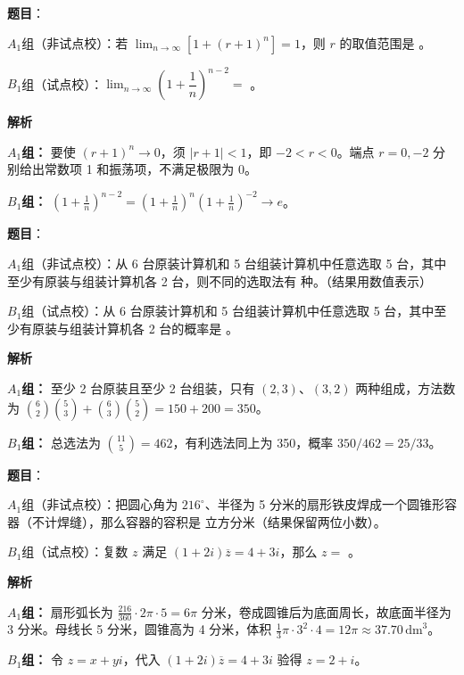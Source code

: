 \begin{answer}

\textbf{题目}：

$A_1$组（非试点校）：若 $\lim_{n\to\infty}[1+(r+1)^n]=1$，则 $r$ 的取值范围是 \gkblank{}。

$B_1$组（试点校）：$\lim_{n\to\infty}\left(1+\dfrac1n\right)^{n-2}=$ \gkblank{}。

\textbf{解析}

\textbf{$A_1$组：} 要使 $(r+1)^n\to0$，须 $|r+1|<1$，即 $-2<r<0$。端点 $r=0,-2$ 分别给出常数项 1 和振荡项，不满足极限为 0。

\textbf{$B_1$组：} $\left(1+\frac1n\right)^{n-2}=\left(1+\frac1n\right)^n\left(1+\frac1n\right)^{-2}\to e$。


\end{answer}
\begin{answer}

\textbf{题目}：

$A_1$组（非试点校）：从 6 台原装计算机和 5 台组装计算机中任意选取 5 台，其中至少有原装与组装计算机各 2 台，则不同的选取法有 \gkblank{} 种。（结果用数值表示）

$B_1$组（试点校）：从 6 台原装计算机和 5 台组装计算机中任意选取 5 台，其中至少有原装与组装计算机各 2 台的概率是 \gkblank{}。

\textbf{解析}

\textbf{$A_1$组：} 至少 2 台原装且至少 2 台组装，只有 $(2,3)$、$(3,2)$ 两种组成，方法数为 $\binom62\binom53+\binom63\binom52=150+200=350$。

\textbf{$B_1$组：} 总选法为 $\binom{11}{5}=462$，有利选法同上为 350，概率 $350/462=25/33$。


\end{answer}
\begin{answer}

\textbf{题目}：

$A_1$组（非试点校）：把圆心角为 $216^\circ$、半径为 5 分米的扇形铁皮焊成一个圆锥形容器（不计焊缝），那么容器的容积是 \gkblank{} 立方分米（结果保留两位小数）。

$B_1$组（试点校）：复数 $z$ 满足 $(1+2i)\overline z=4+3i$，那么 $z=$ \gkblank{}。

\textbf{解析}

\textbf{$A_1$组：} 扇形弧长为 $\frac{216}{360}\cdot2\pi\cdot5=6\pi$ 分米，卷成圆锥后为底面周长，故底面半径为 3 分米。母线长 5 分米，圆锥高为 4 分米，体积 $\frac13\pi\cdot3^2\cdot4=12\pi\approx37.70\,\mathrm{dm}^3$。

\textbf{$B_1$组：} 令 $z=x+yi$，代入 $(1+2i)\overline z=4+3i$ 验得 $z=2+i$。


\end{answer}
